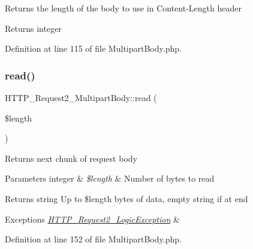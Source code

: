 Returns the length of the body to use in Content-\/\+Length header

\begin{DoxyReturn}{Returns}
integer 
\end{DoxyReturn}


Definition at line 115 of file Multipart\+Body.\+php.

\hypertarget{classHTTP__Request2__MultipartBody_aa392b34f91cbaf97962b7f77ea287cad}{}\label{classHTTP__Request2__MultipartBody_aa392b34f91cbaf97962b7f77ea287cad} 
\subsubsection{\texorpdfstring{read()}{read()}}
{\footnotesize\ttfamily H\+T\+T\+P\+\_\+\+Request2\+\_\+\+Multipart\+Body\+::read (\begin{DoxyParamCaption}\item[{}]{\$length }\end{DoxyParamCaption})}

Returns next chunk of request body


\begin{DoxyParams}[1]{Parameters}
integer & {\em \$length} & Number of bytes to read\\
\hline
\end{DoxyParams}
\begin{DoxyReturn}{Returns}
string Up to \$length bytes of data, empty string if at end 
\end{DoxyReturn}

\begin{DoxyExceptions}{Exceptions}
{\em \hyperlink{classHTTP__Request2__LogicException}{H\+T\+T\+P\+\_\+\+Request2\+\_\+\+Logic\+Exception}} & \\
\hline
\end{DoxyExceptions}


Definition at line 152 of file Multipart\+Body.\+php.

\hypertarget{classHTTP__Request2__MultipartBody_af603c54ddf7736f0cbfcab11f64e089b}{}\label{classHTTP__Request2__MultipartBody_af603c54ddf7736f0cbfcab11f64e089b} 
